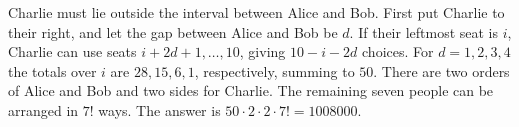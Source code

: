 Charlie must lie outside the interval between Alice and Bob. First put Charlie to their right, and let the gap between Alice and Bob be $d$. If their leftmost seat is $i$, Charlie can use seats $i+2d+1,\ldots,10$, giving $10-i-2d$ choices. For $d=1,2,3,4$ the totals over $i$ are $28,15,6,1$, respectively, summing to $50$. There are two orders of Alice and Bob and two sides for Charlie. The remaining seven people can be arranged in $7!$ ways. The answer is $50\cdot2\cdot2\cdot7!=\boxed{1008000}$.
